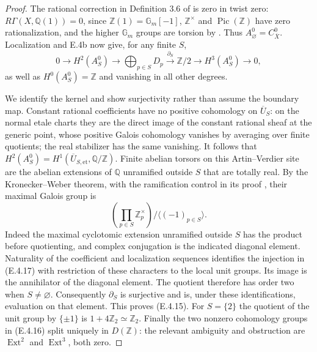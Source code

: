 \begin{proof}
The rational correction in Definition 3.6 of
\citet{D_FlachMorin2018} is zero in twist zero:
$R\Gamma(X,\mathbb Q(1))=0$, since $\mathbb Z(1)=\mathbb G_m[-1]$,
$\mathbb Z^\times$ and $\operatorname{Pic}(\mathbb Z)$ have zero
rationalization, and the higher $\mathbb G_m$ groups are torsion
by \citet[II, Proposition 2.1]{D_MilneADT2006}.
Thus $A_\varnothing^0=C_{\overline X}^0$.
Localization and E.4b now give, for any finite $S$,
\[
 0\longrightarrow H^2(A_S^0)\longrightarrow
       \bigoplus_{p\in S}D_p
   \xrightarrow{\partial_S}\mathbb Z/2
   \longrightarrow H^3(A_S^0)\longrightarrow0,
 \tag{E.4.17}
\]
as well as $H^0(A_S^0)=\mathbb Z$ and vanishing in all other degrees.

We identify the kernel and show surjectivity rather than assume
the boundary map. Constant rational coefficients have no positive
cohomology on $\overline U_S$: on the normal etale charts they are
the direct image of the constant rational sheaf at the generic
point, whose positive Galois cohomology vanishes by averaging over
finite quotients; the real stabilizer has the same vanishing.
It follows that
$H^2(A_S^0)=H^1(\overline U_{S,\mathrm{et}},\mathbb Q/\mathbb Z)$.
Finite abelian torsors on this Artin--Verdier site are the abelian
extensions of $\mathbb Q$ unramified outside $S$ that are totally
real. By the Kronecker--Weber theorem, with the ramification
control in its proof
\citep[I, Theorem 4.16 and Lemma 4.17, pp.~49--50]{D_MilneCFT2020},
their maximal Galois group is
\[
 \left(\prod_{p\in S}\mathbb Z_p^\times\right)/
                      \langle(-1)_{p\in S}\rangle.
\]
Indeed the maximal cyclotomic extension unramified outside $S$
has the product before quotienting, and complex conjugation is
the indicated diagonal element. Naturality of the coefficient
and localization sequences identifies the injection in (E.4.17)
with restriction of these characters to the local unit groups.
Its image is the annihilator of the diagonal element. The
quotient therefore has order two when $S\ne\varnothing$.
Consequently $\partial_S$ is surjective and is, under these
identifications, evaluation on that element. This proves
(E.4.15). For $S=\{2\}$ the quotient of the unit group by
$\{\pm1\}$ is $1+4\mathbb Z_2\simeq\mathbb Z_2$.
Finally the two nonzero cohomology groups in (E.4.16) split
uniquely in $D(\mathbb Z)$: the relevant ambiguity and obstruction
are $\operatorname{Ext}^2$ and $\operatorname{Ext}^3$, both zero.
\end{proof}

